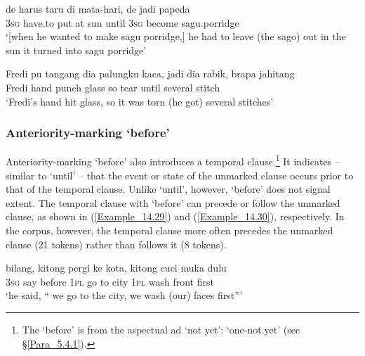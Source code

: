 \ea\label{Example_14.27}
\gll {\ldots} {de} {harus} {taru} {di} {mata-hari,} {} {de} {jadi} {papeda}\\ 
  {} \textsc{3sg}  have.to  put  at  sun  until  \textsc{3sg}  become  sagu.porridge\\
 ‘[when he wanted to make sagu porridge,] he had to leave (the sago) out in the sun  it turned into sagu porridge’ \textstyleExampleSource{[080922-010a-CvNF.007-0008]}
\z

\ea
\label{Example_14.28}
\gll Fredi  pu  tangang  dia  palungku  kaca,  jadi  dia  rabik,     brapa  jahitang\\  
Fredi    hand    punch  glass  so    tear   until  several  stitch\\
 ‘Fredi’s hand hit glass, so it was torn  (he got) several stitches’ \textstyleExampleSource{[081006-032-Cv.0066]}
\z

\subsubsection[Anteriority{}-marking seblum ‘before’]{Anteriority-marking  ‘before’}
\label{Para_14.2.3.4}
Anteriority-marking  ‘before’ also introduces a temporal clause.\footnote{The   ‘before’ is  from the aspectual ad  ‘not yet’:  ‘one-not.yet’ (see §\ref{Para_5.4.1}).} It indicates – similar to  ‘until’ – that the event or state of the unmarked clause occurs prior to that of the temporal clause. Unlike  ‘until’, however,  ‘before’ does not signal extent. The temporal clause with  ‘before’ can precede or follow the unmarked clause, as shown in (\ref{Example_14.29}) and (\ref{Example_14.30}), respectively. In the corpus, however, the temporal clause more often precedes the unmarked clause (21 tokens) rather than follows it (8 tokens).
%

\ea\label{Example_14.29}
 {bilang,} {} {kitong} {pergi} {ke} {kota,} {kitong} {cuci} {muka} {dulu}\\ %
 \textsc{3sg}  say  before  \textsc{1pl}  go  to  city  \textsc{1pl}  wash  front  first\\
\glt ‘he said, `` we go to the city, we wash (our) faces first''' \textstyleExampleSource{[080917-008-NP.0126]}
\z

